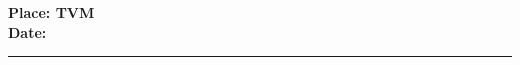 \begin{flushleft}
		\begin{minipage}{0.5\textwidth}
\vspace{2\baselineskip}
	{\bf Place: TVM \\}
{\bf Date: \reportSubmissionDate}
	\end{minipage}
	\end{flushleft}

\begin{flushright}
	\begin{minipage}{0.5\textwidth}
		\centering
		\hrule 
		\vspace{0.5\baselineskip}
		{\bf \firstAuthor  \firstAuthorID \\}
		{\bf \secondAuthor  \secondAuthorID\\} 
		{\bf \thirdAuthor  \thirdAuthorID\\} 
		{\bf \fourthAuthor  \fourthAuthorID\\}  \par
	\end{minipage}
	\end{flushright}

